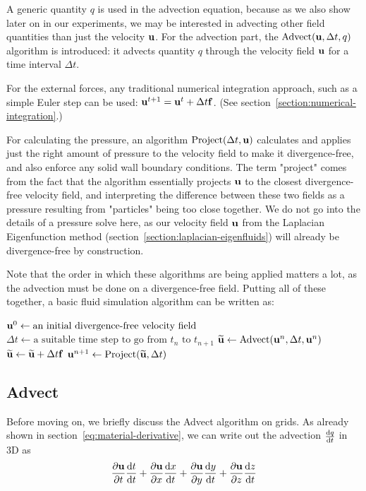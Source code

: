 A generic quantity $q$ is used in the advection equation, because as we also
show later on in our experiments, we may be interested in advecting other field
quantities than just the velocity $\vb{u}$. For the advection part, the
$\text{Advect}(\vb{u}, \Delta t, q)$ algorithm is introduced: it advects
quantity $q$ through the velocity field $\vb{u}$ for a time interval $\Delta t$. 

For the external forces, any traditional numerical integration approach, such as
a simple Euler step can be used: $\vb{u}^{t+1} = \vb{u}^t + \Delta t \vb{f}$.
(See section~\ref{section:numerical-integration}.)

For calculating the pressure, an algorithm $\text{Project}(\Delta t, \vb{u})$
calculates and applies just the right amount of pressure to the velocity field
to make it divergence-free, and also enforce any solid wall boundary
conditions. The term "project" comes from the fact that the algorithm
essentially projects $\vb{u}$ to the closest divergence-free velocity field, and
interpreting the difference between these two fields as a pressure resulting
from "particles" being too close together. We do not go into the details of a
pressure solve here, as our velocity field $\vb{u}$ from the Laplacian
Eigenfunction method (section~\ref{section:laplacian-eigenfluids}) will already
be divergence-free by construction. 

Note that the order in which these algorithms are being applied matters a lot,
as the advection must be done on a divergence-free field. Putting all of these
together, a basic fluid simulation algorithm can be written as:

\begin{algorithmic}
    \State $\vb{u}^0 \gets \text{an initial divergence-free velocity field}$
        \State $\Delta t 
            \gets \text{a suitable time step to go from $t_n$ to $t_{n+1}$}$
        \State $\widetilde{\vb{u}} 
            \gets \text{Advect}(\vb{u}^n,\Delta t, \vb{u}^n)$
        \State $\widetilde{\vb{u}} 
            \gets \widetilde{\vb{u}} + \Delta t \vb{f}$
        \State $\vb{u}^{n+1}
        \gets \text{Project}(\widetilde{\vb{u}},\Delta t)$
            \EndFor {}
\end{algorithmic}

\subsection*{Advect}
Before moving on, we briefly discuss the Advect algorithm on grids. As already
shown in section~\ref{eq:material-derivative}, we can write out the advection 
$\dv{q}{t}$ in 3D as
$$\pdv{\vb{u}}{t}\dv{t}{t} 
                    + \pdv{\vb{u}}{x}\dv{x}{t} 
                    + \pdv{\vb{u}}{y}\dv{y}{t} 
                    + \pdv{\vb{u}}{z}\dv{z}{t}$$

